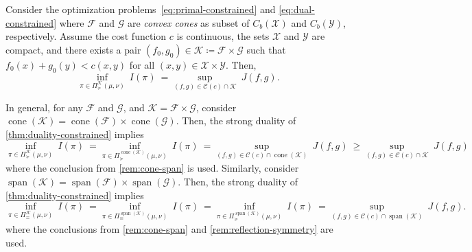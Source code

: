 \documentclass[10pt]{article}
\newcommand{\op}[1]{\operatorname{#1}}
\newcommand{\calC}{\mathcal{C}}
\newcommand{\calF}{\mathcal{F}}
\newcommand{\calG}{\mathcal{G}}
\newcommand{\calK}{\mathcal{K}}
\newcommand{\calX}{\mathcal{X}}
\newcommand{\calY}{\mathcal{Y}}
\numberwithin{equation}{section}
\begin{document}
\begin{theorem}\label{thm:duality-constrained}
	Consider the optimization problems~\eqref{eq:primal-constrained} and \eqref{eq:dual-constrained} where $\calF$ and $\calG$ are {\em convex cones} as subset of $C_b(\calX)$ and $C_b(\calY)$, respectively. Assume the cost function $c$ is continuous, the sets $\calX$ and $\calY$ are compact, and there exists a pair $(f_0,g_0)\in \calK \coloneqq \calF\times \calG$ such that $f_0(x)+g_0(y)< c(x,y)$ for all $(x,y)\in \calX \times \calY$. Then,
	\begin{equation*}
		\inf_{\pi \in \Pi_\succeq^\calK(\mu,\nu)}~ I(\pi) ~= \sup_{(f,g) \in \calC(c) \cap \calK}~J(f,g).
	\end{equation*}
\end{theorem}
\begin{remark}
In general, for any $\calF$ and $\calG$, and $\calK = \calF \times \calG$, consider $\op{cone}(\calK)=\op{cone}(\calF) \times \op{cone}(\calG) $. Then, the strong duality of \autoref{thm:duality-constrained} implies
\begin{equation*}
\inf_{\pi \in \Pi_\succeq^{\calK}(\mu,\nu)}~ I(\pi) ~= \inf_{\pi \in \Pi_\succeq^{\op{cone}(\calK)}(\mu,\nu)}~ I(\pi) ~= \sup_{(f,g) \in \calC(c) \cap \op{cone}(\calK)}~J(f,g)~\geq \sup_{(f,g) \in \calC(c) \cap \calK}~J(f,g)
\end{equation*}
where the conclusion from \autoref{rem:cone-span} is used. 
Similarly, consider $\op{span}(\calK)=\op{span}(\calF) \times \op{span}(\calG) $. Then, the strong duality of \autoref{thm:duality-constrained} implies
\begin{equation*}
\inf_{\pi \in \Pi_\equiv^{\calK}(\mu,\nu)}~ I(\pi) ~= \inf_{\pi \in \Pi_\equiv^{\op{span}(\calK)}(\mu,\nu)}~ I(\pi) ~= \inf_{\pi \in \Pi_\succeq^{\op{span}(\calK)}(\mu,\nu)}~ I(\pi) ~= \sup_{(f,g) \in \calC(c) \cap \op{span}(\calK)}~J(f,g). 
\end{equation*}
where the conclusions from \autoref{rem:cone-span} and \autoref{rem:reflection-symmetry} are used. 
\end{remark}
\end{document}
